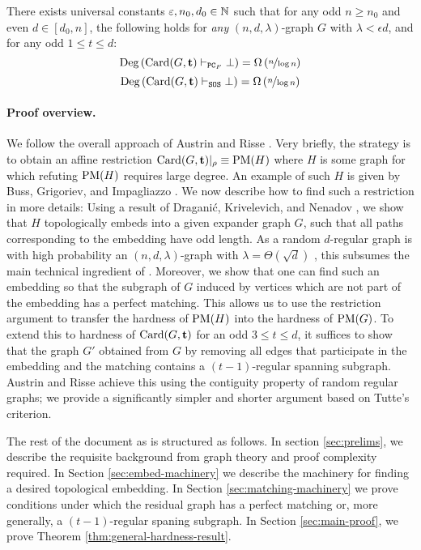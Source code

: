 \documentclass[11pt]{article}
\begin{document}
\begin{theorem}\label{thm:general-hardness-result}

  There exists universal constants $\varepsilon, n_0, d_0 \in \mathbb{N}$ such that for any odd $n \ge n_0$ and even $d \in [d_0, n]$, the following holds for \emph{any} $(n, d, \lambda)$-graph $G$ with $\lambda < \epsilon d$, and for any odd $1 \leq t \leq d$:  
  \[ \text{Deg}\left(\text{Card}(G, \mathbf{t}) \vdash_{\texttt{PC}_F} \bot\right) = \Omega\left(\nicefrac{n}{\log n}\right)\]
  \[ \text{Deg}\left(\text{Card}(G, \mathbf{t}) \vdash_{\texttt{SOS}} \bot\right) = \Omega\left(\nicefrac{n}{\log n}\right)\]  
\end{theorem}

\paragraph{Proof overview.} We follow the overall approach of Austrin and Risse \cite{Austrin_2022}. Very briefly, the strategy is to obtain an affine restriction $\text{Card}(G, \mathbf{t})|_\rho \equiv \text{PM}(H)$ where $H$ is some graph for which refuting $\text{PM}(H)$ requires large degree. An example of such $H$ is given by Buss, Grigoriev, and Impagliazzo \cite{buss1999linear}. We now describe how to find such a restriction in more details: Using a result of Dragani\'c, Krivelevich, and Nenadov \cite{draganic22rolling}, we show that $H$ topologically embeds into a given expander graph $G$, such that all paths corresponding to the embedding have odd length. As a random $d$-regular graph is with high probability an $(n, d, \lambda)$-graph with $\lambda = \Theta(\sqrt{d})$ , this subsumes the main technical ingredient of \cite{Austrin_2022}. Moreover, we show that one can find such an embedding so that the subgraph of $G$ induced by vertices which are not part of the embedding has a perfect matching. This allows us to use the restriction argument to transfer the hardness of $\text{PM}(H)$ into the hardness of $\text{PM}(G)$. To extend this to hardness of $\text{Card}(G, \mathbf{t})$ for an odd $3 \le t \leq d$, it suffices to show that the graph $G'$ obtained from $G$ by removing all edges that participate in the embedding and the matching contains a $(t-1)$-regular spanning subgraph. Austrin and Risse achieve this using the contiguity property of random regular graphs; we provide a significantly simpler and shorter argument based on Tutte's criterion.

The rest of the document as is structured as follows. In section \ref{sec:prelims}, we describe the requisite background from graph theory and proof complexity required. In Section \ref{sec:embed-machinery} we describe the machinery for finding a desired topological embedding. In Section \ref{sec:matching-machinery} we prove conditions under which the residual graph has a perfect matching or, more generally, a $(t-1)$-regular spaning subgraph. In Section \ref{sec:main-proof}, we prove Theorem \ref{thm:general-hardness-result}. 
\end{document}
